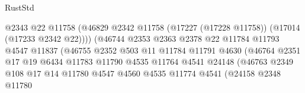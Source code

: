 \begin{lexlean}{RustStd}
\begin{coremodule}
                                            @2343
                                            @22
                                            @11758
                                            (@46829
                                              @2342
                                              @11758
                                              (@17227 (@17228 @11758))
                                              (@17014 (@17233 @2342 @22))))
                                          (@46744
                                            @2353
                                            @2363
                                            @2378
                                            @22
                                            @11784
                                            @11793
                                            @4547
                                            @11837
                                            (@46755
                                              @2352
                                              @503
                                              @11
                                              @11784
                                              @11791
                                              @4630
                                              (@46764
                                                @2351
                                                @17
                                                @19
                                                @6434
                                                @11783
                                                @11790
                                                @4535
                                                @11764
                                                @4541
                                                @24148
                                                (@46763
                                                  @2349
                                                  @108
                                                  @17
                                                  @14
                                                  @11780
                                                  @4547
                                                  @4560
                                                  @4535
                                                  @11774
                                                  @4541
                                                  (@24158
                                                    @2348
                                                    @11780

\end{coremodule}
\end{lexlean}
